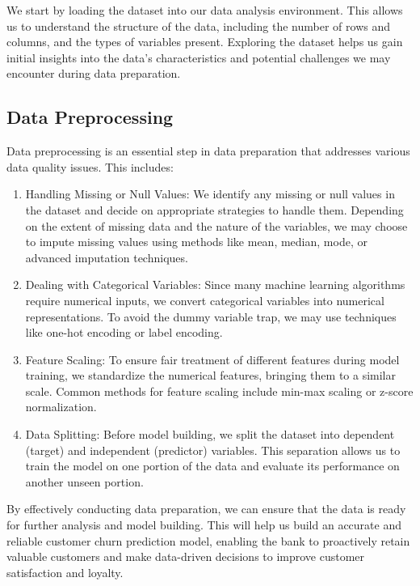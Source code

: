 \documentclass[11pt,a4paper]{article}
\begin{document}
We start by loading the dataset into our data analysis environment. This allows us to understand the structure of the data, including the number of rows and columns, and the types of variables present. Exploring the dataset helps us gain initial insights into the data's characteristics and potential challenges we may encounter during data preparation.

\subsection{Data Preprocessing}

Data preprocessing is an essential step in data preparation that addresses various data quality issues. This includes:

\begin{enumerate}
    \item Handling Missing or Null Values: We identify any missing or null values in the dataset and decide on appropriate strategies to handle them. Depending on the extent of missing data and the nature of the variables, we may choose to impute missing values using methods like mean, median, mode, or advanced imputation techniques.
    \item Dealing with Categorical Variables: Since many machine learning algorithms require numerical inputs, we convert categorical variables into numerical representations. To avoid the dummy variable trap, we may use techniques like one-hot encoding or label encoding.
    \item Feature Scaling: To ensure fair treatment of different features during model training, we standardize the numerical features, bringing them to a similar scale. Common methods for feature scaling include min-max scaling or z-score normalization.
    \item Data Splitting: Before model building, we split the dataset into dependent (target) and independent (predictor) variables. This separation allows us to train the model on one portion of the data and evaluate its performance on another unseen portion.
\end{enumerate}

By effectively conducting data preparation, we can ensure that the data is ready for further analysis and model building. This will help us build an accurate and reliable customer churn prediction model, enabling the bank to proactively retain valuable customers and make data-driven decisions to improve customer satisfaction and loyalty.
\end{document}
